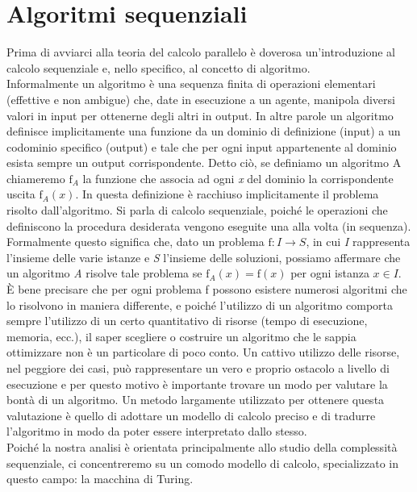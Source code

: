 \chapter{Algoritmi sequenziali}
Prima di avviarci alla teoria del calcolo parallelo è doverosa un'introduzione al calcolo sequenziale e, nello specifico, al concetto di algoritmo.\\
Informalmente un algoritmo è una sequenza finita di operazioni elementari (effettive e non ambigue) che, date in esecuzione a un agente, manipola diversi valori in input per ottenerne degli altri in output. In altre parole un algoritmo definisce implicitamente una funzione da un dominio di definizione (input) a un codominio specifico (output) e tale che per ogni input appartenente al dominio esista sempre un output corrispondente. Detto ciò, se definiamo un algoritmo A chiameremo $\mathrm{f}_{A}$ la funzione che associa ad ogni \textit{x} del dominio la corrispondente uscita $\mathrm{f}_{A}(x)$. In questa definizione è racchiuso implicitamente il problema risolto dall'algoritmo. Si parla di calcolo sequenziale, poiché le operazioni che definiscono la procedura desiderata vengono eseguite una alla volta (in sequenza).\\
Formalmente questo significa che, dato un problema $\mathrm{f}: I \rightarrow S$, in cui \textit{I} rappresenta l'insieme delle varie istanze e \textit{S} l'insieme delle soluzioni, possiamo affermare che un algoritmo \textit{A} risolve tale problema se $\mathrm{f}_{A}(x) = \mathrm{f}(x)$ per ogni istanza $x \in I$.\\
È bene precisare che per ogni problema f possono esistere numerosi algoritmi che lo risolvono in maniera differente, e poiché l'utilizzo di un algoritmo comporta sempre l'utilizzo di un certo quantitativo di risorse (tempo di esecuzione, memoria, ecc.), il saper scegliere o costruire un algoritmo che le sappia ottimizzare non è un particolare di poco conto. Un cattivo utilizzo delle risorse, nel peggiore dei casi, può rappresentare un vero e proprio ostacolo a livello di esecuzione e per questo motivo è importante trovare un modo per valutare la bontà di un algoritmo. Un metodo largamente utilizzato per ottenere questa valutazione è quello di adottare un modello di calcolo preciso e di tradurre l'algoritmo in modo da poter essere interpretato dallo stesso.\\
Poiché la nostra analisi è orientata principalmente allo studio della complessità sequenziale, ci concentreremo su un comodo modello di calcolo, specializzato in questo campo: la macchina di Turing.
